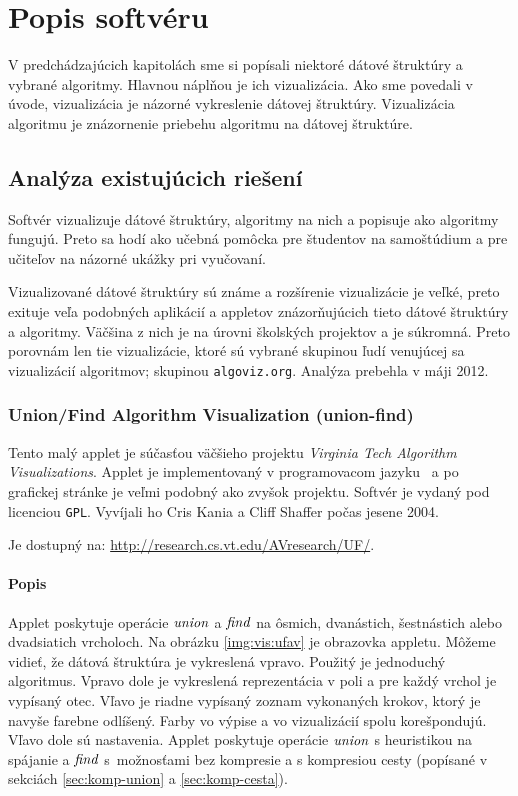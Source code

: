 \chapter{Popis softvéru}\label{chap:popis}

V predchádzajúcich kapitolách sme si popísali niektoré dátové štruktúry a 
vybrané algoritmy. Hlavnou náplňou je ich vizualizácia. Ako sme povedali v 
úvode, vizualizácia je názorné vykreslenie dátovej štruktúry. Vizualizácia 
algoritmu je znázornenie priebehu algoritmu na dátovej štruktúre. 

\section{Analýza existujúcich riešení}

Softvér vizualizuje dátové štruktúry, algoritmy na nich a popisuje ako 
algoritmy fungujú. Preto sa hodí ako učebná pomôcka pre študentov na 
samoštúdium a pre učiteľov na názorné ukážky pri vyučovaní.

Vizualizované dátové štruktúry sú známe a rozšírenie vizualizácie je veľké, 
preto exituje veľa podobných aplikácií a appletov znázorňujúcich tieto 
dátové štruktúry a algoritmy. Väčšina z nich je na úrovni školských projektov 
a je súkromná. Preto porovnám len tie vizualizácie, ktoré sú vybrané skupinou 
ľudí venujúcej sa vizualizácií algoritmov; skupinou {\tt algoviz.org}. 
Analýza prebehla v máji 2012.

\subsection{Union/Find Algorithm Visualization (union-find)}\label{sec:ufav}
Tento malý applet je súčasťou väčšieho projektu \emph{Virginia Tech Algorithm 
Visualizations}. Applet je implementovaný v programovacom jazyku \Java\ a po
grafickej stránke je veľmi podobný ako zvyšok projektu. Softvér je vydaný pod 
licenciou {\tt GPL}. Vyvíjali ho Cris Kania a Cliff Shaffer počas jesene 2004. 

Je dostupný na: \url{http://research.cs.vt.edu/AVresearch/UF/}.

\subsubsection{Popis}
Applet poskytuje operácie $\mathop{\mathit{union}}$ a $\mathop{\mathit{find}}$ na ôsmich, dvanástich, šestnástich 
alebo dvadsiatich vrcholoch. Na obrázku \ref{img:vis:ufav} je obrazovka 
appletu. Môžeme vidieť, že dátová štruktúra je vykreslená vpravo. Použitý je 
jednoduchý algoritmus. Vpravo dole je vykreslená reprezentácia v poli a 
pre každý vrchol je vypísaný otec. Vľavo je riadne vypísaný zoznam vykonaných 
krokov, ktorý je navyše farebne odlíšený. Farby vo výpise a vo vizualizácií 
spolu korešpondujú. Vľavo dole sú nastavenia. 
Applet poskytuje operácie $\mathop{\mathit{union}}$ s heuristikou na spájanie a $\mathop{\mathit{find}}$ 
s~možnosťami bez kompresie a s kompresiou cesty 
(popísané v sekciách \ref{sec:komp-union} a \ref{sec:komp-cesta}).

